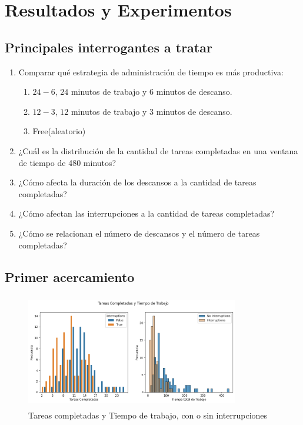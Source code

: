 \documentclass[10pt,a4paper,twocolumn]{article}
\begin{document}
\section{Resultados y Experimentos} 

\subsection{Principales interrogantes a tratar}
\begin{enumerate}
    \item Comparar qu\'e estrategia de administración de tiempo es m\'as productiva:
    \begin{enumerate}
        \item $24-6$, $24$ minutos de trabajo y $6$ minutos de descanso.
        \item $12-3$, $12$ minutos de trabajo y $3$ minutos de descanso.
        \item Free(aleatorio)
    \end{enumerate}
    
    \item ¿Cuál es la distribución de la cantidad de tareas completadas en una ventana de tiempo de 480 minutos?
    \item ¿Cómo afecta la duración de los descansos a la cantidad de tareas completadas?
    \item ¿Cómo afectan las interrupciones a la cantidad de tareas completadas?
    \item ¿Cómo se relacionan el número de descansos y el número de tareas completadas? 
\end{enumerate}

\subsection{Primer acercamiento}


\begin{figure}[H] %
    \includegraphics[width=9.3cm, height=5cm, left]{tareas_completada_y_tiempo_de_trabajo.png} %
    \caption{Tareas completadas y Tiempo de trabajo, con o sin interrupciones} %
    \label{fig:mi_imagen5} %
\end{figure}
\end{document}
